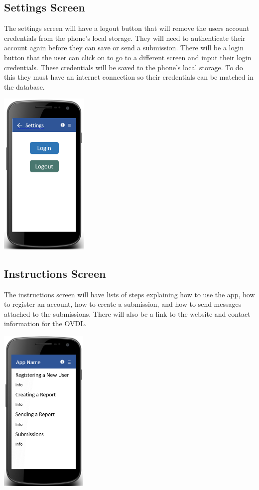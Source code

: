 \documentclass[onecolumn, draftclsnofoot, article, 10pt, compsoc]{IEEEtran}
\begin{document}
\subsection{Settings Screen}
The settings screen will have a logout button that will remove the users account credentials from the phone’s local storage. They will need to authenticate their account again before they can save or send a submission. There will be a login button that the user can click on to go to a different screen and input their login credentials. These credentials will be saved to the phone's local storage. To do this they must have an internet connection so their credentials can be matched in the database. 
\begin{center}
\includegraphics[height=8cm]{settingsscreen.png}
\end{center}

\subsection{Instructions Screen}
The instructions screen will have lists of steps explaining how to use the app, how to register an account, how to create a submission, and how to send messages attached to the submissions. There will also be a link to the website and contact information for the OVDL. 
\newline
\begin{center}
\includegraphics[height=8cm]{instructionsscreen.png}
\end{center}
\end{document}
